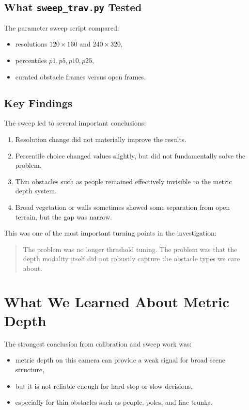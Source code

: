 \documentclass[11pt]{article}
\begin{document}
\subsection{What \texttt{sweep\_trav.py} Tested}
The parameter sweep script compared:
\begin{itemize}[leftmargin=*]
\item resolutions $120 \times 160$ and $240 \times 320$,
\item percentiles $p1, p5, p10, p25$,
\item curated obstacle frames versus open frames.
\end{itemize}

\subsection{Key Findings}
The sweep led to several important conclusions:
\begin{enumerate}[leftmargin=*]
\item Resolution change did not materially improve the results.
\item Percentile choice changed values slightly, but did not fundamentally solve the problem.
\item Thin obstacles such as people remained effectively invisible to the metric depth system.
\item Broad vegetation or walls sometimes showed some separation from open terrain, but the gap was narrow.
\end{enumerate}

This was one of the most important turning points in the investigation:
\begin{quote}
The problem was no longer threshold tuning. The problem was that the depth modality itself did not robustly capture the obstacle types we care about.
\end{quote}

\section{What We Learned About Metric Depth}
The strongest conclusion from calibration and sweep work was:
\begin{itemize}[leftmargin=*]
\item metric depth on this camera can provide a weak signal for broad scene structure,
\item but it is not reliable enough for hard stop or slow decisions,
\item especially for thin obstacles such as people, poles, and fine trunks.
\end{itemize}
\end{document}
